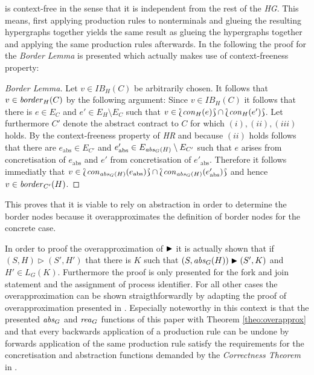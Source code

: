 	is context-free in the sense that it is independent from the rest of the
	\emph{\ac{HG}}. This means, first applying production rules to nonterminals
	and glueing the resulting hypergraphs together yields the same result as
	glueing the hypergraphs together and applying the same production rules
	afterwards. In the following the proof for the \emph{Border Lemma} is
	presented which actually makes use of context-freeness property:
	\begin{proof}[Border Lemma]
		Let $v\in\mathit{IB}_{H}(C)$ be arbitrarily chosen. It follows that
		$v\in\mathit{border}_{H}(C)$ by the following argument:
		Since $v\in\mathit{IB}_{H}(C)$ it follows that there is $e\in E_{C}$ and
		$e'\in E_{H}\setminus E_{C}$ such that
		$v\in\Lbag\mathit{con}_{H}(e)\Rbag\cap\Lbag\mathit{con}_{H}(e')\Rbag$. Let furthermore
		$C'$ denote the abstract contract to $C$ for which $(i), (ii), (iii)$
		holds. By the context-freeness property of \emph{\ac{HR}} and because
		$(ii)$ holds follows that
		there are $e_{\text{abs}}\in E_{C'}$ and $e'_{\text{abs}}\in
		E_{\mathit{abs}_{G}(H)}\setminus E_{C'}$ such that $e$ arises from concretisation
		of $e_{\text{abs}}$ and $e'$ from concretisation of $e'_{\text{abs}}$.
		Therefore it follows immediatly that
		$v\in\Lbag\mathit{con}_{\mathit{abs}_G(H)}(e_{\text{abs}})\Rbag\cap
		\Lbag\mathit{con}_{\mathit{abs}_G(H)}(e'_{\text{abs}})\Rbag$ and hence
		$v\in\mathit{border}_{C'}(H)$.
	\end{proof}
	This proves that it is viable to rely on abstraction in order to determine
	the border nodes because it overapproximates the definition of border nodes
	for the concrete case.

	In order to proof the overapproximation of $\blacktriangleright$ it is actually shown that
	if $(S, H)\rhd(S', H')$ that there is $K$ such that
	$(S,\mathit{abs}_{G}(H))\blacktriangleright(S',K)$ and $H'\in L_{G}(K)$. Furthermore the proof is
	only presented for the fork and join statement and the assignment of process
	identifier. For all other cases the overapproximation can be shown
	straigthforwardly by adapting the proof of overapproximation presented in
	\cite{fmsd}. Especially noteworthy in this context is that the
	presented $\mathit{abs}_{G}$ and $\mathit{rea}_{G}$ functions of this paper with Theorem
	\ref{theo:overapprox} and that every backwards application of a production
	rule can be undone by forwards application of the same production rule
	satisfy the requirements for the concretisation and abstraction functions
	demanded by the \emph{Correctness Theorem} in \cite[p. 19]{fmsd}.

